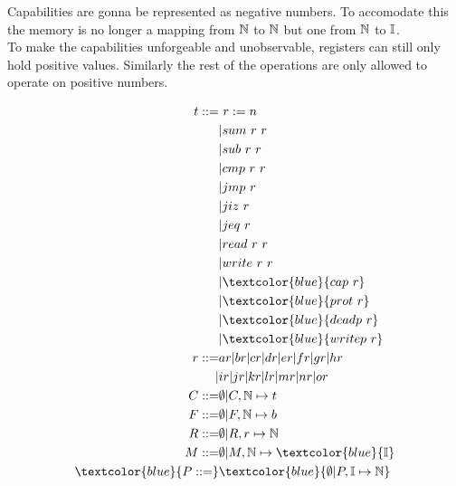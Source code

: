 \documentclass{article}
\begin{document}
Capabilities are gonna be represented as negative numbers. To accomodate this the memory is no longer a mapping from $\mathbb N$ to $\mathbb N$ but one from $\mathbb N$ to $\mathbb I$. \\
To make the capabilities unforgeable and unobservable, registers can still only hold positive values. Similarly the rest of the operations are only allowed to operate on positive numbers.

\begin{align*}
    t ::= &\ r:=n \\
        &| sum\ r\ r \\
        &| sub\ r\ r \\
        &| cmp\ r\ r \\
        &| jmp\ r \\
        &| jiz\ r \\
        &| jeq\ r \\
        &| read\ r\ r \\
        &| write\ r\ r \\
        &| \textcolor{blue}{cap\ r} \\
        &| \textcolor{blue}{prot\ r} \\
        &| \textcolor{blue}{deadp\ r} \\
        &| \textcolor{blue}{writep\ r} \\
    r ::= & ar|br|cr|dr|er|fr|gr|hr \\
        |&ir|jr|kr|lr|mr|nr|or \\
    C ::=& \emptyset | C,\N\mapsto t \\
    F ::=& \emptyset | F,\N\mapsto b \\
    R ::=& \emptyset | R, r\mapsto \N \\
    M ::=& \emptyset | M, \N\mapsto \textcolor{blue}{\mathbb{I}} \\
    \textcolor{blue}{P ::=}& \textcolor{blue}{\emptyset | P, \mathbb I \mapsto \N} \\
\end{align*}
\end{document}
